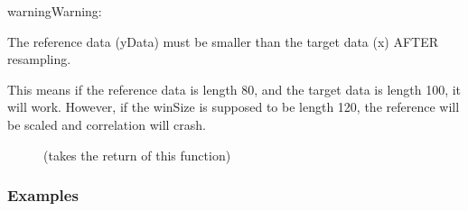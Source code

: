 \documentclass[letterpaper,10pt,english]{sphinxmanual}
\begin{document}
\begin{fulllineitems}
\begin{quote}
\begin{description}
\begin{description}
\end{description}

\end{description}\end{quote}

\begin{sphinxadmonition}{warning}{Warning:}
\begin{DUlineblock}{0em}
\item[] The reference data (yData) must be smaller than the target data (x)
AFTER resampling.
\item[] This means if the reference data is length 80, and the target data is
length 100, it will work. However, if the winSize is supposed to be length
120, the reference will be scaled and correlation will crash.
\end{DUlineblock}
\end{sphinxadmonition}


\nopagebreak

\begin{description}
\item[{{\hyperref[\detokenize{generated/seg1d.algorithm.combine_corr:seg1d.algorithm.combine_corr}]{}}}] \leavevmode
\sphinxAtStartPar
(takes the return of this function)

\end{description}


\subsubsection*{Examples}

\begin{sphinxVerbatim}[commandchars=\\\{\}]
   
   
\end{sphinxVerbatim}

\begin{sphinxVerbatim}[commandchars=\\\{\}]
      
      
\end{sphinxVerbatim}


\end{fulllineitems}
\end{document}
